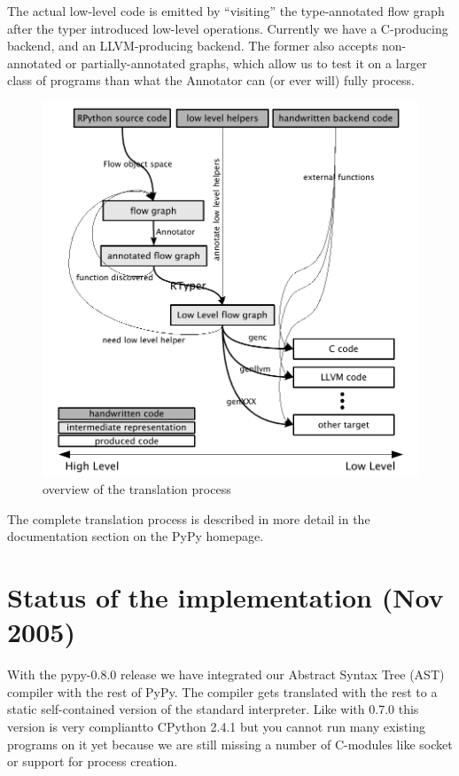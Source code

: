 \documentclass[a4paper,11pt,english]{article}
\begin{document}
The actual low-level code is emitted by ``visiting'' the type-annotated
flow graph after the typer introduced low-level operations.  Currently we have
a C-producing backend, and an LLVM-producing backend.  The former also
accepts non-annotated or partially-annotated graphs, which allow us to
test it on a larger class of programs than what the Annotator can (or
ever will) fully process.
\begin{figure}[htbp]\begin{center}
\includegraphics{translation-greyscale-small.pdf}
overview of the translation process
\end{center}\end{figure}
The complete translation process is described in more detail in the
documentation section on the PyPy homepage\footnotemark[8].



\hypertarget{status-of-the-implementation-nov-2005}{}
\section{Status of the implementation (Nov 2005)}

With the pypy-0.8.0 release we have integrated our Abstract Syntax
Tree (AST) compiler with the rest of PyPy. The compiler gets
translated with the rest to a static self-contained version of the
standard interpreter.  Like with 0.7.0 this version is very compliant\footnotemark[9] to CPython 2.4.1 but you cannot run many existing programs on it
yet because we are still missing a number of C-modules like socket or
support for process creation.
\end{document}
